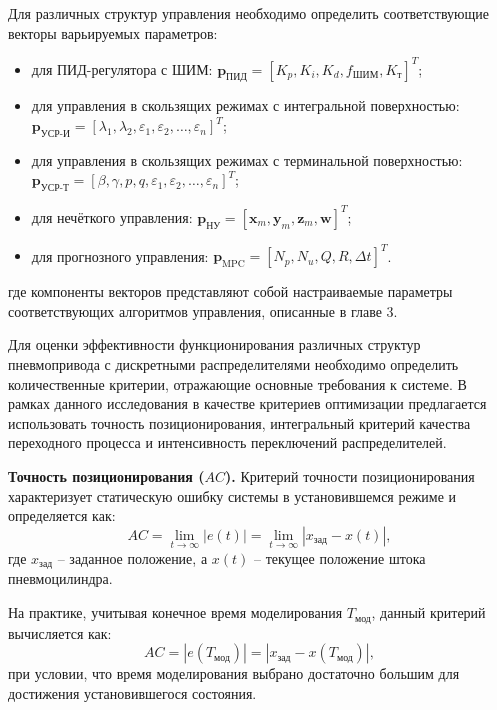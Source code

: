 Для различных структур управления необходимо определить соответствующие векторы варьируемых параметров:
\begin{itemize}
	\item для ПИД-регулятора с ШИМ: $\mathbf{p}_{\text{ПИД}} = [K_p, K_i, K_d, f_{\text{ШИМ}}, K_{\text{т}}]^T$;
	\item для управления в скользящих режимах с интегральной поверхностью: $\mathbf{p}_{\text{УСР-И}} = [\lambda_1, \lambda_2, \varepsilon_1, \varepsilon_2, \ldots, \varepsilon_n]^T$;
	\item для управления в скользящих режимах с терминальной поверхностью: $\mathbf{p}_{\text{УСР-Т}} = [\beta, \gamma, p, q, \varepsilon_1, \varepsilon_2, \ldots, \varepsilon_n]^T$;
	\item для нечёткого управления: $\mathbf{p}_{\text{НУ}} = [\mathbf{x}_m, \mathbf{y}_m, \mathbf{z}_m, \mathbf{w}]^T$;
	\item для прогнозного управления: $\mathbf{p}_{\text{MPC}} = [N_p, N_u, Q, R, \Delta t]^T$.
\end{itemize}
где компоненты векторов представляют собой настраиваемые параметры соответствующих алгоритмов управления, описанные в главе 3.

Для оценки эффективности функционирования различных структур
пневмопривода с дискретными распределителями необходимо определить
количественные критерии, отражающие основные требования к системе.
В рамках данного исследования в качестве критериев оптимизации предлагается использовать точность позиционирования,
интегральный критерий качества переходного процесса и интенсивность переключений распределителей.

\textbf{Точность позиционирования ($AC$).}
Критерий точности позиционирования характеризует статическую ошибку системы в установившемся режиме и определяется как:
\begin{equation}
	AC = \lim_{t \to \infty} |e(t)| = \lim_{t \to \infty} |x_{\text{зад}} - x(t)|,
\end{equation}
где $x_{\text{зад}}$ -- заданное положение, а $x(t)$ -- текущее положение штока пневмоцилиндра.

На практике, учитывая конечное время моделирования $T_{\text{мод}}$, данный критерий вычисляется как:
\begin{equation}
	AC = |e(T_{\text{мод}})| = |x_{\text{зад}} - x(T_{\text{мод}})|,
\end{equation}
при условии, что время моделирования выбрано достаточно большим для достижения установившегося состояния.

